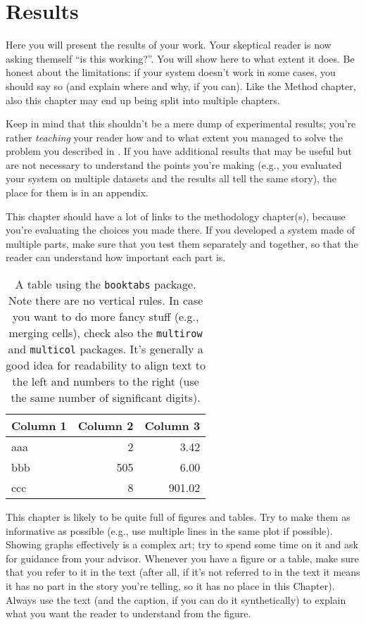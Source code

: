 \chapter{Results}
\label{sec:results}

Here you will present the results of your work. Your skeptical reader is now asking themself
``is this working?''. You will show here to what extent it does. Be honest about the limitations:
if your system doesn't work in some cases, you should say so (and explain where and why, if you
can). Like the Method chapter, also this chapter may end up being split into multiple chapters.

Keep in mind that this shouldn't be a mere dump of experimental results; you're rather
\emph{teaching} your reader how and to what extent you managed to solve the problem you
described in . If you have additional results that may be useful
but are not necessary to understand the points you're making (e.g., you evaluated your system
on multiple datasets and the results all tell the same story), the place for them is in an
appendix.

This chapter should have a lot of links to the methodology chapter(s), because you're
evaluating the choices you made there. If you developed a system made of multiple parts,
make sure that you test them separately and together, so that the reader can understand how
important each part is.

\begin{table}
    \centering
    \begin{tabular}{lrr}
        \toprule
        \textbf{Column 1} & \textbf{Column 2} & \textbf{Column 3} \\
        \midrule
        aaa &   2 &   3.42 \\
        bbb & 505 &   6.00 \\
        ccc &   8 & 901.02 \\
        \bottomrule
    \end{tabular}
    \caption{A table using the \latex \texttt{booktabs} package. Note there are no vertical
    rules. In case you want to do more fancy stuff (e.g., merging cells), check also the
    \texttt{multirow} and \texttt{multicol} packages. It's generally a good idea for readability
    to align text to the left and numbers to the right (use the same number of significant digits).}
    \label{tab:table}
\end{table}

This chapter is likely to be quite full of figures and tables. Try to make them as informative
as possible (e.g., use multiple lines in the same plot if possible). Showing graphs
effectively is a complex art; try to spend some time on it and ask for guidance from your
advisor. Whenever you have a figure or a table, make sure that you refer to it in the text
(after all, if it's not referred to in the text it means it has no part in the story you're
telling, so it has no place in this Chapter). Always use the text (and the caption, if you can
do it synthetically) to explain what you want the reader to understand from the figure.


